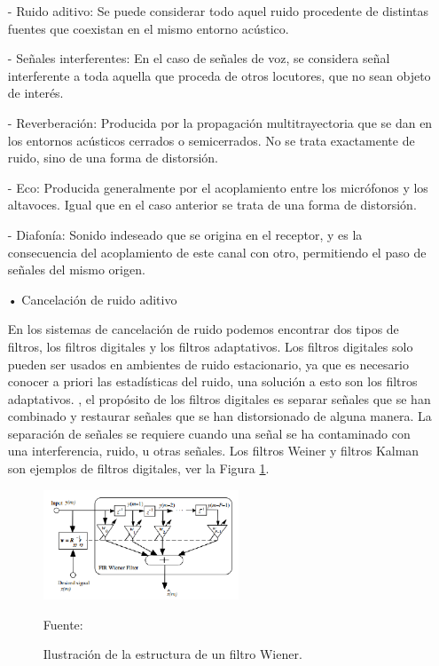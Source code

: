 \begin{enumerate}
\begin{enumerate}
\item[-]Ruido aditivo: Se puede considerar todo aquel ruido procedente de distintas fuentes que coexistan en el mismo entorno acústico.
\item[-]Señales interferentes: En el caso de señales de voz, se considera señal interferente a toda aquella que proceda de otros locutores, que no sean objeto de interés.
\item[-]Reverberación: Producida por la propagación multitrayectoria que se dan en los entornos acústicos cerrados o semicerrados. No se trata exactamente de ruido, sino de una forma de distorsión.
\item[-]Eco: Producida generalmente por el acoplamiento entre los micrófonos y los altavoces. Igual que en el caso anterior se trata de una forma de distorsión.
\item[-]Diafonía: Sonido indeseado que se origina en el receptor, y es la consecuencia del acoplamiento de este canal con otro, permitiendo el paso de señales del mismo origen.
\end{enumerate}

\begin{enumerate}
\item[•]Cancelación de ruido aditivo
\par
En los sistemas de cancelación de ruido podemos encontrar dos tipos de filtros, los filtros digitales y los filtros adaptativos. Los filtros digitales solo pueden ser usados en ambientes de ruido estacionario, ya que es necesario conocer a priori las estadísticas del ruido, una solución a esto son los filtros adaptativos.
\vskip 0.5cm
\cite{shubhra}, el propósito de los filtros digitales es separar señales que se han combinado y restaurar señales que se han distorsionado de alguna manera. La separación de señales se requiere cuando una señal se ha contaminado con una interferencia, ruido, u otras señales. Los filtros Weiner y filtros Kalman son ejemplos de filtros digitales, ver la Figura \ref{fig:figura2.14}.

\newpage
\vskip 0.5cm
\begin{figure}[ht]
\begin{center}
\includegraphics[width=0.55\textwidth]{Imagenes/Cap2/image014}
\end{center}
\begin{center}
\vskip -0.5cm
\caption{\small{Ilustración de la estructura de un filtro Wiener.}}
\label{fig:figura2.14}
{\small{Fuente: \cite{shubhra}}}
\end{center}
\end{figure}


\end{enumerate}
\end{enumerate}
